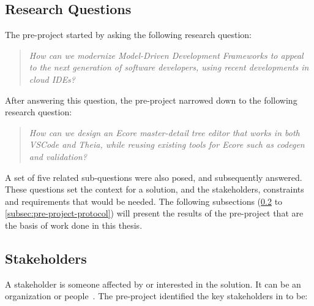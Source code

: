 \subsection{Research Questions}

The pre-project started by asking the following research question:
\begin{quote}
\textit{How can we modernize Model-Driven Development Frameworks to appeal to
the next generation of software developers, using recent developments in cloud
IDEs?}~\cite[p.~3]{rekstadModelingEnvironmentCloud2020}
\end{quote}

After answering this question, the pre-project narrowed down to the following research question:

\begin{quote}
\textit{How can we design an Ecore master-detail tree editor that works in both VSCode and Theia, while reusing existing tools for Ecore such as codegen and validation?}~\cite[p.~24]{rekstadModelingEnvironmentCloud2020}
\end{quote}

A set of five related sub-questions were also posed, and subsequently answered.
These questions set the context for a solution, and the stakeholders, constraints and requirements that would be needed.
The following subsections (\ref{subsec:stakeholders} to \ref{subsec:pre-project-protocol}) will present the results of the pre-project that are the basis of work done in this thesis.

\subsection{Stakeholders}\label{subsec:stakeholders}

A stakeholder is someone affected by or interested in the solution.
It can be an organization or people~\cite[p.~52]{bassSoftwareArchitecturePractice2013}.
The pre-project identified the key stakeholders in \cite[p.~3]{rekstadModelingEnvironmentCloud2020} to be:

